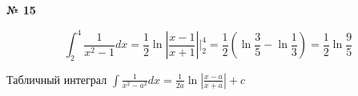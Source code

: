 \documentclass{article}
\begin{document}
\textbf{№ 15} 

$$ \int_{2}^{4} \frac{1}{x^2-1}dx 
= \frac{1}{2} \ln{\left|\frac{x-1}{x+1}\right|} \bigg\vert_{2}^{4}
= \frac{1}{2} \left( \ln{\frac{3}{5}} - \ln{\frac{1}{3}}\right)
= \frac{1}{2} \ln{\frac{9}{5}}$$

Табличный интеграл $ \int \frac{1}{x^2-a^2}dx = \frac{1}{2a} \ln{\left|\frac{x-a}{x+a}\right|} + c$
\end{document}
